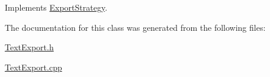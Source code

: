 Implements \hyperlink{class_export_strategy_a8f24eb340762e0c1b1faaefb32087468}{Export\-Strategy}.



The documentation for this class was generated from the following files\-:\begin{DoxyCompactItemize}
\item 
\hyperlink{_text_export_8h}{Text\-Export.\-h}\item 
\hyperlink{_text_export_8cpp}{Text\-Export.\-cpp}\end{DoxyCompactItemize}
